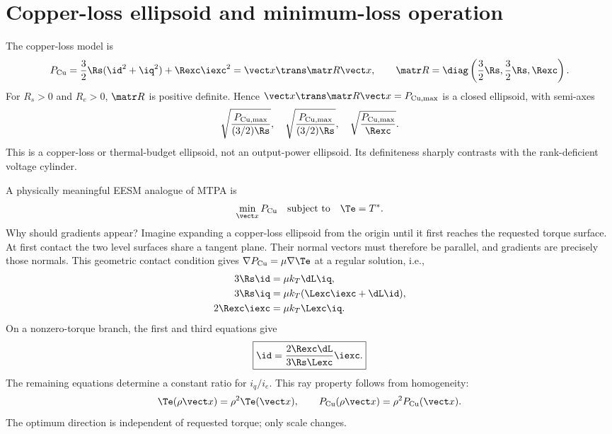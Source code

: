 \section{Copper-loss ellipsoid and minimum-loss operation}

The copper-loss model is
\begin{equation}
 \Pcu=\frac32\Rs(\id^2+\iq^2)+\Rexc\iexc^2
 =\state\trans\Rl\state,
 \qquad
 \Rl=\diag\left(\frac32\Rs,\frac32\Rs,\Rexc\right).
 \label{eq:copper-loss}
\end{equation}
For $R_s>0$ and $R_e>0$, $\Rl$ is positive definite.  Hence
$\state\trans\Rl\state=P_{\mathrm{Cu,max}}$ is a closed ellipsoid, with
semi-axes
\begin{equation}
 \sqrt{\frac{\Pmax}{(3/2)\Rs}},\quad
 \sqrt{\frac{\Pmax}{(3/2)\Rs}},\quad
 \sqrt{\frac{\Pmax}{\Rexc}}.
\end{equation}
This is a copper-loss or thermal-budget ellipsoid, not an output-power
ellipsoid.  Its definiteness sharply contrasts with the rank-deficient voltage
cylinder.

A physically meaningful EESM analogue of MTPA is
\begin{equation}
 \min_{\state}\Pcu\quad\text{subject to}\quad\Te=T^*.
 \label{eq:min-loss}
\end{equation}
Why should gradients appear?  Imagine expanding a copper-loss ellipsoid from
the origin until it first reaches the requested torque surface.  At first
contact the two level surfaces share a tangent plane.  Their normal vectors
must therefore be parallel, and gradients are precisely those normals.  This
geometric contact condition gives
$\nabla\Pcu=\mu\nabla\Te$ at a regular solution, i.e.,
\begin{align}
 3\Rs\id&=\mu\kt\dL\iq,\\
 3\Rs\iq&=\mu\kt(\Lexc\iexc+\dL\id),\\
 2\Rexc\iexc&=\mu\kt\Lexc\iq.
\end{align}
On a nonzero-torque branch, the first and third equations give
\begin{equation}
 \boxed{\id=\frac{2\Rexc\dL}{3\Rs\Lexc}\iexc.}\label{eq:minloss-ratio}
\end{equation}
The remaining equations determine a constant ratio for $i_q/i_e$.  This ray
property follows from homogeneity:
\begin{equation}
 \Te(\rho\state)=\rho^2\Te(\state),\qquad
 \Pcu(\rho\state)=\rho^2\Pcu(\state).
\end{equation}
The optimum direction is independent of requested torque; only scale changes.

